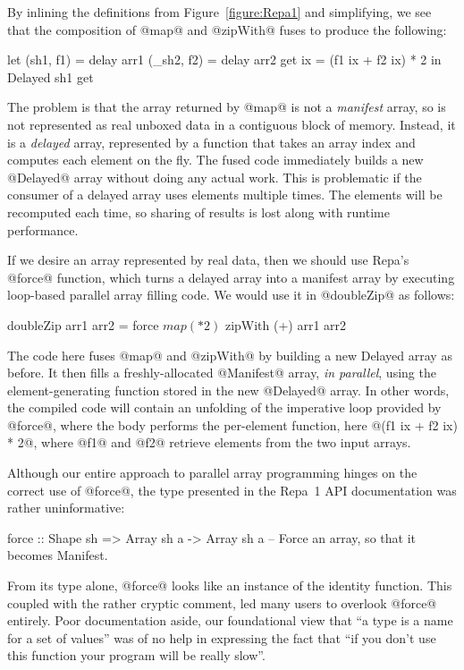 \eject
By inlining the definitions from Figure~\ref{figure:Repa1} and simplifying, we see that the composition of @map@ and @zipWith@ fuses to produce the following:
%
\begin{small}
\begin{code}
    let (sh1,  f1) = delay arr1
        (_sh2, f2) = delay arr2
        get ix     = (f1 ix + f2 ix) * 2
    in Delayed sh1 get
\end{code}
\end{small}
%
The problem is that the array returned by @map@ is not a \emph{manifest} array, so is not represented as real unboxed data in a contiguous block of memory. Instead, it is a \emph{delayed} array, represented by a function that takes an array index and computes each element on the fly. The fused code immediately builds a new @Delayed@ array without doing any actual work. This is problematic if the consumer of a delayed array uses elements multiple times. The elements will be recomputed each time, so sharing of results is lost along with runtime performance.

If we desire an array represented by real data, then we should use Repa's @force@ function, which turns a delayed array into a manifest array by executing loop-based parallel array filling code. We would use it in @doubleZip@ as follows:
%
\begin{small}
\begin{code}
    doubleZip arr1 arr2
     = force $ map (* 2) $ zipWith (+) arr1 arr2
\end{code}
\end{small}
%
The code here fuses @map@ and @zipWith@ by building a new Delayed array as before. It then fills a freshly-allocated @Manifest@ array, \emph{in parallel}, using the element-generating function stored in the new @Delayed@ array. In other words, the compiled code will contain an unfolding of the imperative loop provided by @force@, where the body performs the per-element function, here @(f1 ix + f2 ix) * 2@, where @f1@ and @f2@ retrieve elements from the two input arrays. 

Although our entire approach to parallel array programming hinges on the correct use of @force@, the type presented in the Repa~1 API documentation was rather uninformative:

\begin{small}
\begin{code}
  force :: Shape sh => Array sh a -> Array sh a
  -- Force an array, so that it becomes Manifest.
\end{code}
\end{small}
%
From its type alone, @force@ looks like an instance of the identity function. This coupled with the rather cryptic comment, led many users to overlook @force@ entirely. Poor documentation aside, our foundational view that ``a type is a name for a set of values'' was of no help in expressing the fact that ``if you don't use this function your program will be really slow''. 


